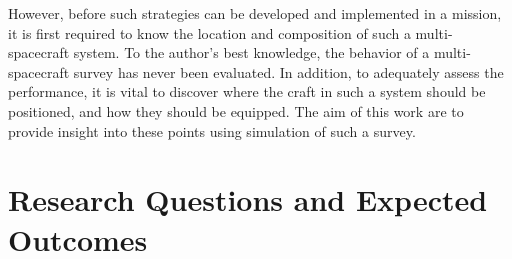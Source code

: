 However, before such strategies can be developed and implemented in a mission, it is first required to know the location and composition of such a multi-spacecraft system. To the author's best knowledge, the behavior of a multi-spacecraft survey has never been evaluated. In addition, to adequately assess the performance, it is vital to discover where the craft in such a system should be positioned, and how they should be equipped. The aim of this work are to provide insight into these points using simulation of such a survey.

\section{Research Questions and Expected Outcomes}
\label{sec:researchquestions}
